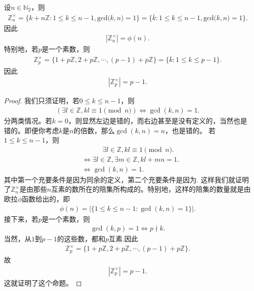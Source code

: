 \documentclass[../../main.tex]{subfiles}
\begin{document}
\begin{proposition}
设$n \in \mathbb{N}_2$，则
\begin{align*}
\mathbb{Z} _{n}^{\times}=\{k+n\mathbb{Z} :1\leqslant k\leqslant n-1,\mathrm{gcd(}k,n)=1\}=\{\overline{k}:1\leqslant k\leqslant n-1,\mathrm{gcd(}k,n)=1\}.
\end{align*}
因此 
\begin{align*}
|\mathbb{Z}_n^\times| = \phi(n) .
\end{align*}
特别地，若$p$是一个素数，则
\begin{align*}
\mathbb{Z}_p^\times = \{1 + p\mathbb{Z}, 2 + p\mathbb{Z}, \cdots, (p - 1) + p\mathbb{Z}\}=\{\overline{k}:1\leqslant k\leqslant p-1\}.
\end{align*}
因此
\begin{align*}
|\mathbb{Z}_p^\times| = p - 1 .
\end{align*}
\end{proposition}
\begin{proof}
我们只须证明，若$0 \leqslant k \leqslant n - 1$，则
\begin{align*}
(\exists l \in \mathbb{Z}, kl \equiv 1 \pmod{n}) \iff \gcd(k, n) = 1 .
\end{align*}
分两类情况。若$k = 0$，则显然左边是错的，而右边甚至是没有定义的，当然也是错的。即便你考虑$k$是$n$的倍数，那么$\gcd(k, n) = n$，也是错的。
若$1 \leqslant k \leqslant n - 1$，则
\begin{align*}
&\quad \quad \quad \exists l \in \mathbb{Z}, kl \equiv 1 \pmod{n} .
\\
&\iff \exists l \in \mathbb{Z}, \exists m \in \mathbb{Z}, kl + mn = 1 .
\\
&\iff \gcd(k, n) = 1 .
\end{align*}
其中第一个充要条件是因为同余的定义，第二个充要条件是因为.
这样我们就证明了$\mathbb{Z}_n^\times$是由那些$n$互素的数所在的陪集所构成的。特别地，这样的陪集的数量就是由欧拉$\phi$函数给出的，即
\begin{align*}
\phi(n) = |\{1 \leqslant k \leqslant n - 1 : \gcd(k, n) = 1\}| .
\end{align*}
接下来，若$p$是一个素数，则
\begin{align*}
\gcd(k, p) = 1 \iff p \nmid k.
\end{align*}
当然，从$1$到$p - 1$的这些数，都和$p$互素.因此
\begin{align*}
\mathbb{Z}_p^\times = \{1 + p\mathbb{Z}, 2 + p\mathbb{Z}, \cdots, (p - 1) + p\mathbb{Z}\} .
\end{align*}
故
\begin{align*}
|\mathbb{Z}_p^\times| = p - 1 .
\end{align*}
这就证明了这个命题。
\end{proof}
\end{document}
